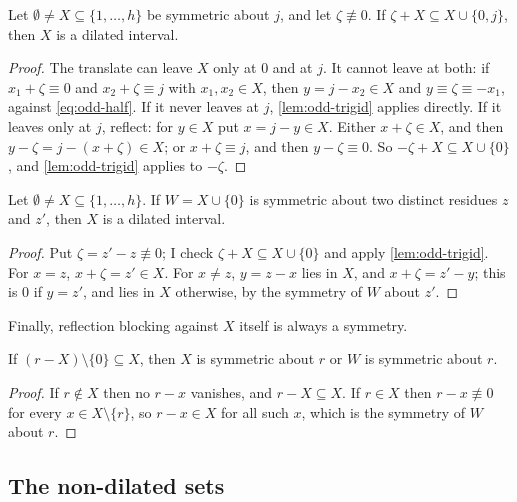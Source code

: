 \begin{lemma}
\label{lem:odd-symfail}
Let $\emptyset\ne X\subseteq\{1,\dots,h\}$ be symmetric about $j$, and let
$\zeta\not\equiv0$. If $\zeta+X\subseteq X\cup\{0,j\}$, then $X$ is a dilated
interval.
\end{lemma}

\begin{proof}
The translate can leave $X$ only at $0$ and at $j$. It cannot leave at both:
if $x_1+\zeta\equiv0$ and $x_2+\zeta\equiv j$ with $x_1,x_2\in X$, then
$y=j-x_2\in X$ and $y\equiv\zeta\equiv-x_1$, against \eqref{eq:odd-half}. If
it never leaves at $j$, \autoref{lem:odd-trigid} applies directly. If it
leaves only at $j$, reflect: for $y\in X$ put $x=j-y\in X$. Either
$x+\zeta\in X$, and then $y-\zeta=j-(x+\zeta)\in X$; or $x+\zeta\equiv j$, and
then $y-\zeta\equiv0$. So $-\zeta+X\subseteq X\cup\{0\}$, and
\autoref{lem:odd-trigid} applies to $-\zeta$.
\end{proof}

\begin{lemma}
\label{lem:odd-wunique}
Let $\emptyset\ne X\subseteq\{1,\dots,h\}$. If $W=X\cup\{0\}$ is symmetric
about two distinct residues $z$ and $z'$, then $X$ is a dilated interval.
\end{lemma}

\begin{proof}
Put $\zeta=z'-z\not\equiv0$; I check $\zeta+X\subseteq X\cup\{0\}$ and apply
\autoref{lem:odd-trigid}. For $x=z$, $x+\zeta=z'\in X$. For $x\ne z$, $y=z-x$
lies in $X$, and $x+\zeta=z'-y$; this is $0$ if $y=z'$, and lies in $X$
otherwise, by the symmetry of $W$ about $z'$.
\end{proof}

Finally, reflection blocking against $X$ itself is always a symmetry.

\begin{lemma}
\label{lem:odd-frigid}
If $(r-X)\setminus\{0\}\subseteq X$, then $X$ is symmetric about $r$ or $W$
is symmetric about $r$.
\end{lemma}

\begin{proof}
If $r\notin X$ then no $r-x$ vanishes, and $r-X\subseteq X$. If $r\in X$
then $r-x\not\equiv0$ for every $x\in X\setminus\{r\}$, so $r-x\in X$ for all
such $x$, which is the symmetry of $W$ about $r$.
\end{proof}

\subsection{The non-dilated sets}
\label{sec:odd-nondil}


